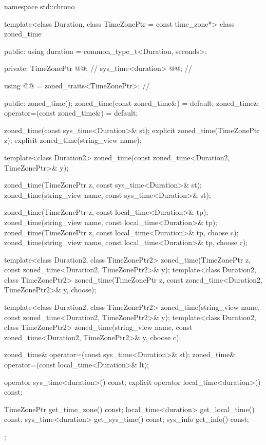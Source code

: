 \begin{codeblock}
namespace std::chrono {
  template<class Duration, class TimeZonePtr = const time_zone*>
  class zoned_time {
  public:
    using duration = common_type_t<Duration, seconds>;

  private:
    TimeZonePtr        @@;                   // \expos
    sys_time<duration> @@;                     // \expos

    using @@ = zoned_traits<TimeZonePtr>;  // \expos

  public:
    zoned_time();
    zoned_time(const zoned_time&) = default;
    zoned_time& operator=(const zoned_time&) = default;

    zoned_time(const sys_time<Duration>& st);
    explicit zoned_time(TimeZonePtr z);
    explicit zoned_time(string_view name);

    template<class Duration2>
      zoned_time(const zoned_time<Duration2, TimeZonePtr>& y);

    zoned_time(TimeZonePtr z,    const sys_time<Duration>& st);
    zoned_time(string_view name, const sys_time<Duration>& st);

    zoned_time(TimeZonePtr z,    const local_time<Duration>& tp);
    zoned_time(string_view name, const local_time<Duration>& tp);
    zoned_time(TimeZonePtr z,    const local_time<Duration>& tp, choose c);
    zoned_time(string_view name, const local_time<Duration>& tp, choose c);

    template<class Duration2, class TimeZonePtr2>
      zoned_time(TimeZonePtr z, const zoned_time<Duration2, TimeZonePtr2>& y);
    template<class Duration2, class TimeZonePtr2>
      zoned_time(TimeZonePtr z, const zoned_time<Duration2, TimeZonePtr2>& y, choose);

    template<class Duration2, class TimeZonePtr2>
      zoned_time(string_view name, const zoned_time<Duration2, TimeZonePtr2>& y);
    template<class Duration2, class TimeZonePtr2>
      zoned_time(string_view name, const zoned_time<Duration2, TimeZonePtr2>& y, choose c);

    zoned_time& operator=(const sys_time<Duration>& st);
    zoned_time& operator=(const local_time<Duration>& lt);

    operator sys_time<duration>() const;
    explicit operator local_time<duration>() const;

    TimeZonePtr          get_time_zone()  const;
    local_time<duration> get_local_time() const;
    sys_time<duration>   get_sys_time()   const;
    sys_info             get_info()       const;
  };

}
\end{codeblock}
